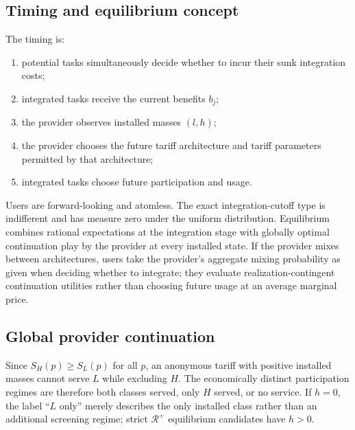 \subsection{Timing and equilibrium concept}

The timing is:
\begin{enumerate}
 \item potential tasks simultaneously decide whether to incur their sunk integration costs;
 \item integrated tasks receive the current benefits $b_j$;
 \item the provider observes installed masses $(l,h)$;
 \item the provider chooses the future tariff architecture and tariff parameters permitted by that architecture;
 \item integrated tasks choose future participation and usage.
\end{enumerate}

Users are forward-looking and atomless. The exact integration-cutoff type is indifferent and has measure zero under the uniform distribution. Equilibrium combines rational expectations at the integration stage with globally optimal continuation play by the provider at every installed state. If the provider mixes between architectures, users take the provider's aggregate mixing probability as given when deciding whether to integrate; they evaluate realization-contingent continuation utilities rather than choosing future usage at an average marginal price.

\subsection{Global provider continuation}

Since $S_H(p)\geq S_L(p)$ for all $p$, an anonymous tariff with positive installed masses cannot serve $L$ while excluding $H$. The economically distinct participation regimes are therefore both classes served, only $H$ served, or no service. If $h=0$, the label ``$L$ only'' merely describes the only installed class rather than an additional screening regime; strict $\mathcal R^+$ equilibrium candidates have $h>0$.

